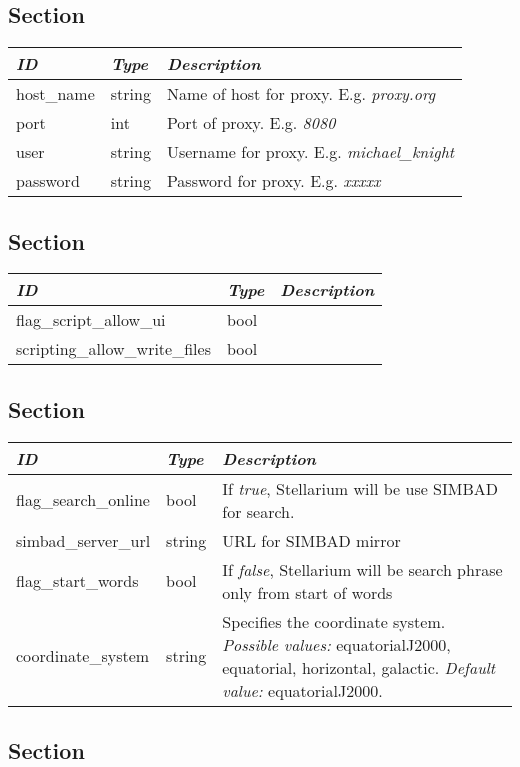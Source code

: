 \subsection{Section }\label{section-proxy}

\begin{longtabu} to \textwidth {l|l|X}
\toprule
\emph{ID} & \emph{Type} & \emph{Description}\tabularnewline
\midrule
host\_name & string & Name of host for proxy. E.g. \emph{proxy.org}\tabularnewline
\midrule
port & int & Port of proxy. E.g. \emph{8080}\tabularnewline
\midrule
user & string & Username for proxy. E.g. \emph{michael\_knight}\tabularnewline
\midrule
password & string & Password for proxy. E.g. \emph{xxxxx}\tabularnewline
\bottomrule
\end{longtabu}

\subsection{Section }\label{section-scripts}

\begin{longtabu} to \textwidth {l|l|X}
\toprule
\emph{ID} & \emph{Type} & \emph{Description}\tabularnewline
\midrule
flag\_script\_allow\_ui & bool &\tabularnewline
\midrule
scripting\_allow\_write\_files & bool &\tabularnewline
\bottomrule
\end{longtabu}

\subsection{Section }\label{section-search}

\begin{longtabu} to \textwidth {l|l|X}
\toprule
\emph{ID} & \emph{Type} & \emph{Description}\tabularnewline
\midrule
flag\_search\_online & bool & If \emph{true}, Stellarium will be use SIMBAD for search.\tabularnewline
\midrule
simbad\_server\_url & string & URL for SIMBAD mirror\tabularnewline
\midrule
flag\_start\_words & bool & If \emph{false}, Stellarium will be search phrase only from start of words\tabularnewline
\midrule
coordinate\_system & string & Specifies the coordinate system. \emph{Possible values:} equatorialJ2000, equatorial, horizontal,
galactic. \emph{Default value:} equatorialJ2000.\tabularnewline
\bottomrule
\end{longtabu}

\subsection{Section
}\label{section-sphericux5fmirror}

